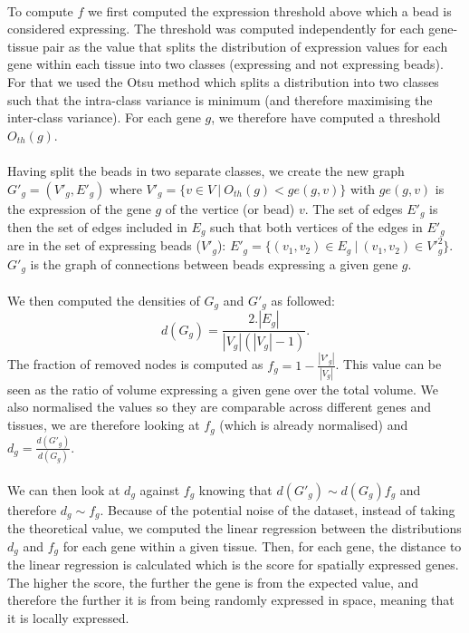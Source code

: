 \documentclass[10pt,a4paper]{article}
\begin{document}
\paragraph{}To compute \(f\) we first computed the expression threshold above which a bead is considered expressing.
The threshold was computed independently for each gene-tissue pair as the value that splits the distribution of expression values for each gene within each tissue into two classes (expressing and not expressing beads).
For that we used the Otsu method \citep{Otsu:1979} which splits a distribution into two classes such that the intra-class variance is minimum (and therefore maximising the inter-class variance).
For each gene \(g\), we therefore have computed a threshold \(O_{th}(g)\).
\paragraph{}Having split the beads in two separate classes, we create the new graph \(G'_{g} = (V'_g, E'_g)\) where \(V'_g=\{v\in V~|~O_{th}(g)<ge(g, v)\}\) with \(ge(g,v)\) is the expression of the gene \(g\) of the vertice (or bead) \(v\).
The set of edges \(E'_g\) is then the set of edges included in \(E_g\) such that both vertices of the edges in \(E'_g\) are in the set of expressing beads (\(V'_g\)): \(E'_g=\{(v_1, v_2) \in E_g~|~(v_1, v_2)\in {V'}_g^{2}\}\).
\(G'_g\) is the graph of connections between beads expressing a given gene \(g\).
\paragraph{}We then computed the densities of \(G_g\) and \(G'_g\) as followed:
\begin{equation}
d(G_g)=\frac{2.|E_g|}{|V_g|(|V_g|-1)}.
\end{equation}
The fraction of removed nodes is computed as \(f_g=1-\frac{|V'_g|}{|V_g|}\).
This value can be seen as the ratio of volume expressing a given gene over the total volume.
We also normalised the values so they are comparable across different genes and tissues, we are therefore looking at \(f_g\) (which is already normalised) and \(d_g=\frac{d(G'_g)}{d(G_g)}\).
\paragraph{}We can then look at \(d_g\) against \(f_g\) knowing that \(d(G'_g)\sim d(G_g)f_g\) and therefore \(d_g\sim f_g\).
Because of the potential noise of the dataset, instead of taking the theoretical value, we computed the linear regression between the distributions \(d_g\) and \(f_g\) for each gene within a given tissue.
Then, for each gene, the distance to the linear regression is calculated which is the score for spatially expressed genes.
The higher the score, the further the gene is from the expected value, and therefore the further it is from being randomly expressed in space, meaning that it is locally expressed.



\end{document}
